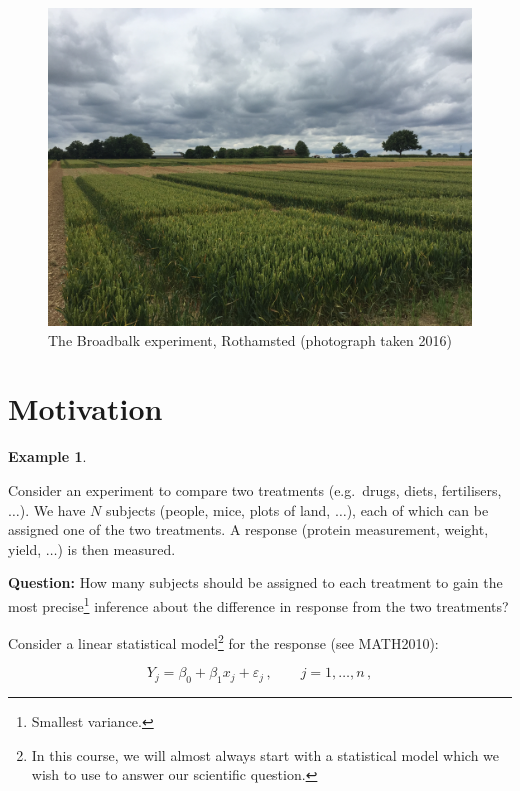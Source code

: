 \documentclass[
]{book}
\theoremstyle{definition}
\theoremstyle{definition}
\newtheorem{example}{Example}[chapter]
\theoremstyle{definition}
\theoremstyle{definition}
\theoremstyle{remark}
\begin{document}
\begin{figure}
 
 {\centering \includegraphics[width=0.75\linewidth]{figures/broadbalk} 
 
 }
 
 \caption{The Broadbalk experiment, Rothamsted (photograph taken 2016)}\label{fig:broadbalk}
 \end{figure}

\hypertarget{motivation}{%
\section{Motivation}\label{motivation}}

\begin{example}
\protect\hypertarget{exm:motivation}{}\label{exm:motivation}

Consider an experiment to compare two treatments (e.g.~drugs, diets, fertilisers, \(\dots\)). We have \(N\) subjects (people, mice, plots of land, \(\dots\)), each of which can be assigned one of the two treatments. A response (protein measurement, weight, yield, \(\dots\)) is then measured.

\end{example}

\textbf{Question:} How many subjects should be assigned to each treatment to gain the most precise\footnote{Smallest variance.} inference about the difference in response from the two treatments?

Consider a linear statistical model\footnote{In this course, we will almost always start with a statistical model which we wish to use to answer our scientific question.} for the response (see MATH2010):

\begin{equation}
Y_j=\beta_{0}+\beta_{1}x_j+\varepsilon_j\,,\qquad j=1, \ldots, n\,,
\label{eq:slr}
\end{equation}
\end{document}
